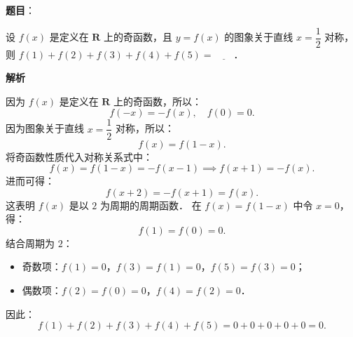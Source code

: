 \begin{answer}

\textbf{题目}：

设 $f(x)$ 是定义在 $\mathbf{R}$ 上的奇函数，且 $y = f(x)$ 的图象关于直线 $x = \dfrac{1}{2}$ 对称，则 $f(1) + f(2) + f(3) + f(4) + f(5) = \underline{\hspace{2em}}$．

\textbf{解析}

因为 $f(x)$ 是定义在 $\mathbf{R}$ 上的奇函数，所以：
\nopagebreak[4]
\[
f(-x) = -f(x), \quad f(0) = 0.
\]
因为图象关于直线 $x = \dfrac{1}{2}$ 对称，所以：
\nopagebreak[4]
\[
f(x) = f(1 - x).
\]
将奇函数性质代入对称关系式中：
\nopagebreak[4]
\[
f(x) = f(1 - x) = -f(x - 1) \implies f(x + 1) = -f(x).
\]
进而可得：
\nopagebreak[4]
\[
f(x + 2) = -f(x + 1) = f(x).
\]
这表明 $f(x)$ 是以 $2$ 为周期的周期函数．
在 $f(x) = f(1 - x)$ 中令 $x = 0$，得：
\nopagebreak[4]
\[
f(1) = f(0) = 0.
\]
结合周期为 $2$：
\begin{itemize}
\item 奇数项：$f(1) = 0$，$f(3) = f(1) = 0$，$f(5) = f(3) = 0$；
\item 偶数项：$f(2) = f(0) = 0$，$f(4) = f(2) = 0$．
\end{itemize}
因此：
\nopagebreak[4]
\[
f(1) + f(2) + f(3) + f(4) + f(5) = 0 + 0 + 0 + 0 + 0 = 0.
\]


\end{answer}
